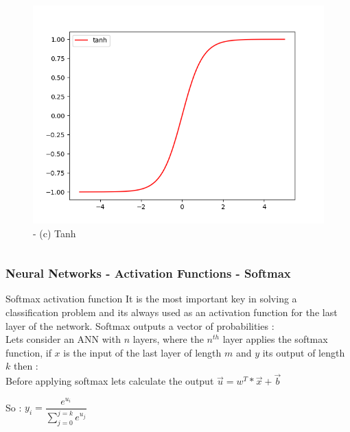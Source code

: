 \documentclass{beamer}
\begin{document}
\begin{frame}
\begin{columns}
\begin{figure}
\includegraphics[scale=0.2]{tanh.png}
\caption{ - (c) Tanh}
\end{figure}
\end{columns}
\end{frame}

\begin{frame}
\frametitle{Neural Networks - Activation Functions - Softmax}
\begin{block}{Softmax activation function}
It is the most important key in solving a classification problem and its always used as an activation function for the last layer of the network. Softmax outputs a vector of probabilities :\\
Lets consider an ANN with $ n $ layers, where the $ n^{th} $ layer applies the softmax function, if $ x $ is the input of the last layer of length $ m $ and $ y $ its output of length $ k $ then :\\
Before applying softmax lets calculate the output $ \vec{u} = w^{T}*\vec{x} + \vec{b} $\\
\begin{center}
So : $ y_i = \dfrac{e^{u_i}}{\sum_{j=0}^{j=k}e^{u_j}} $
\end{center}
\end{block}

\end{frame}
\end{document}
